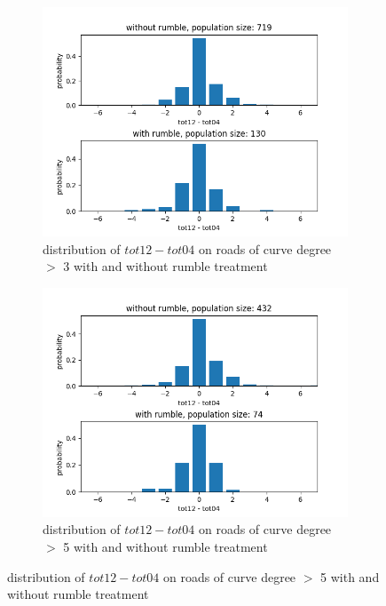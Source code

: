 \documentclass{article}
\begin{document}
\begin{figure}[H]
    \centering
    \begin{subfigure}{.5\textwidth}
        \centering
        \includegraphics[width=1\textwidth]{with-and-without-rumble-curvature-grt3-diff.png}
        \caption{distribution of $tot12-tot04$ on roads of curve degree $>$ 3     with and without rumble treatment}
        \label{fig:curve-grt3}
    \end{subfigure}%
    \begin{subfigure}{.5\textwidth}
        \centering
        \includegraphics[width=1\textwidth]{with-and-without-rumble-curvature-grt5-diff.png}
        \caption{distribution of $tot12-tot04$ on roads of curve degree $>$ 5     with and without rumble treatment}
        \label{fig:curve-grt5}
    \end{subfigure}
\end{figure}
\end{document}
